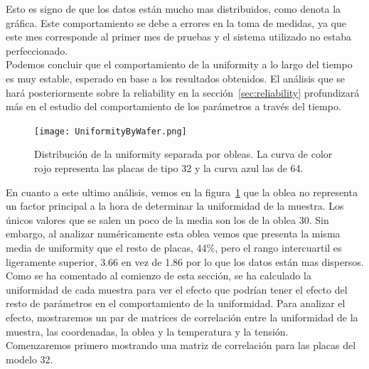 \documentclass[spanish]{template/minim}
\begin{document}
Esto es signo de que los datos están mucho mas distribuidos, como denota la gráfica. Este comportamiento se debe a errores en la toma de medidas, ya que este mes corresponde al primer mes de pruebas y el sistema utilizado no estaba perfeccionado.\\

Podemos concluir que el comportamiento de la uniformity a lo largo del tiempo es muy estable, esperado en base a los resultados obtenidos. El análisis que se hará posteriormente sobre la reliability en la sección~\ref{sec:reliability} profundizará más en el estudio del comportamiento de los parámetros a través del tiempo.\\

\begin{fullwidth}
\begin{figure}[H]
    \centering
    \texttt{[image: UniformityByWafer.png]}
    \caption[Distribución de uniformity por oblea]{
            Distribución de la uniformity separada por obleas. La curva de color rojo representa las placas de tipo 32 y la curva azul las de 64.\label{fig:unif_wafer_dist}
        }
\end{figure}
\end{fullwidth}

En cuanto a este ultimo análisis, vemos en la figura~\ref{fig:unif_wafer_dist} que la oblea no representa un factor principal a la hora de determinar la uniformidad de la muestra. Los únicos valores que se salen un poco de la media son los de la oblea 30. Sin embargo, al analizar numéricamente esta oblea vemos que presenta la misma media de uniformity que el resto de placas, 44\%, pero el rango intercuartil es ligeramente superior, 3.66 en vez de 1.86 por lo que los datos están mas dispersos.\\

Como se ha comentado al comienzo de esta sección, se ha calculado la uniformidad de cada muestra para ver el efecto que podrían tener el efecto del resto de parámetros en el comportamiento de la uniformidad. Para analizar el efecto, mostraremos un par de matrices de correlación entre la uniformidad de la muestra, las coordenadas, la oblea y la temperatura y la tensión.\\

Comenzaremos primero mostrando una matriz de correlación para las placas del
modelo 32.\\
\end{document}
